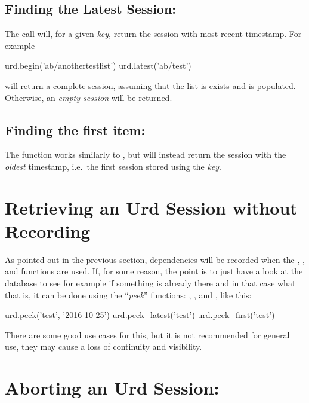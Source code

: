 \subsection{Finding the Latest Session:  }
The  call will, for a given \textsl{key}, return the
session with most recent timestamp.  For example
\begin{python}
urd.begin('ab/anothertestlist')
urd.latest('ab/test')
\end{python}
will return a complete session, assuming that the list is exists and
is populated.  Otherwise, an \textsl{empty session} will be returned.



\subsection{Finding the first item:  }
The  function works similarly to , but
will instead return the session with the \textsl{oldest} timestamp,
i.e.\ the first session stored using the \textsl{key}.





\section{Retrieving an Urd Session without Recording}
\label{sec:avoid_recording_urd_deps}
As pointed out in the previous section, dependencies will be recorded
when the , , and 
functions are used.  If, for some reason, the point is to just have a
look at the database to see for example if something is already there
and in that case what that is, it can be done using the
``\textsl{peek}'' functions: , ,
and
, like this:
\begin{python}
urd.peek('test', '2016-10-25')
urd.peek_latest('test')
urd.peek_first('test')
\end{python}
There are some good use cases for this, but it is not recommended for
general use, they may cause a loss of continuity and visibility.





\section{Aborting an Urd Session:  }


